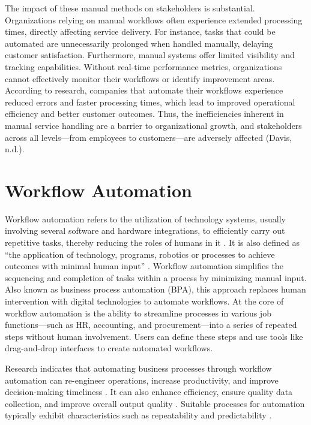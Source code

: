 The impact of these manual methods on stakeholders is substantial. Organizations relying on manual workflows often experience extended processing times, directly affecting service delivery. For instance, tasks that could be automated are unnecessarily prolonged when handled manually, delaying customer satisfaction. Furthermore, manual systems offer limited visibility and tracking capabilities. Without real-time performance metrics, organizations cannot effectively monitor their workflows or identify improvement areas. According to research, companies that automate their workflows experience reduced errors and faster processing times, which lead to improved operational efficiency and better customer outcomes. Thus, the inefficiencies inherent in manual service handling are a barrier to organizational growth, and stakeholders across all levels—from employees to customers—are adversely affected (Davis, n.d.).

\section{Workflow Automation}

Workflow automation refers to the utilization of technology systems, usually involving several software and hardware integrations, to efficiently carry out repetitive tasks, thereby reducing the roles of humans in it \cite{winarko2021}. It is also defined as “the application of technology, programs, robotics or processes to achieve outcomes with minimal human input” \cite{ibm}. Workflow automation simplifies the sequencing and completion of tasks within a process by minimizing manual input. Also known as business process automation (BPA), this approach replaces human intervention with digital technologies to automate workflows. At the core of workflow automation is the ability to streamline processes in various job functions—such as HR, accounting, and procurement—into a series of repeated steps without human involvement. Users can define these steps and use tools like drag-and-drop interfaces to create automated workflows. 

Research indicates that automating business processes through workflow automation can re-engineer operations, increase productivity, and improve decision-making timeliness \cite{abecker2000, aversano2002}. It can also enhance efficiency, ensure quality data collection, and improve overall output quality \cite{pakdil2009}. Suitable processes for automation typically exhibit characteristics such as repeatability and predictability \cite{basu2002}. 

